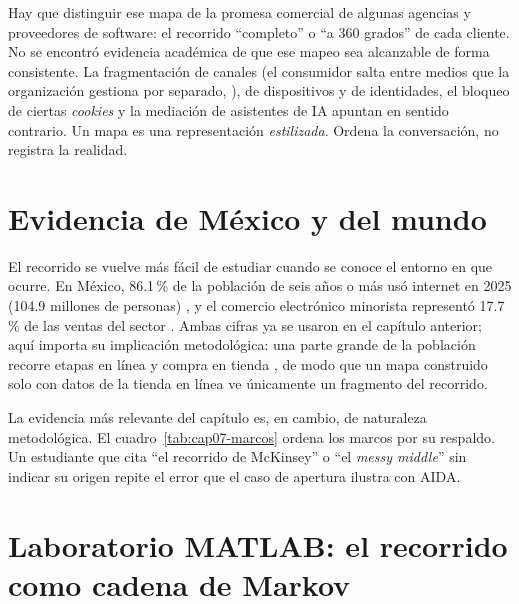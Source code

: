 Hay que distinguir ese mapa de la promesa comercial de algunas agencias y
proveedores de software: el recorrido \enquote{completo} o \enquote{a 360
grados} de cada cliente. No se encontró evidencia académica de que ese mapeo
sea alcanzable de forma consistente. La fragmentación de canales (el consumidor
salta entre medios que la organización gestiona por separado,
\textcite{verhoef2015}), de dispositivos y de
identidades, el bloqueo de ciertas \textit{cookies} y la mediación de
asistentes de IA apuntan en sentido contrario. Un mapa es una representación
\emph{estilizada}. Ordena la conversación, no registra la realidad.

\section{Evidencia de México y del mundo}

El recorrido se vuelve más fácil de estudiar cuando se conoce el entorno en
que ocurre. En México, 86.1\,\% de la población de seis años o más usó
internet en 2025 (104.9 millones de personas) \parencite{inegi2026endutih}, y
el comercio electrónico minorista representó 17.7\,\% de las ventas del
sector \parencite{amvo2026}. Ambas cifras ya se usaron en el capítulo
anterior; aquí importa su implicación metodológica: una parte grande de la
población recorre etapas en línea y compra en tienda
\parencite{halibas2023showrooming}, de modo que un mapa
construido solo con datos de la tienda en línea ve únicamente un fragmento
del recorrido.

La evidencia más relevante del capítulo es, en cambio, de naturaleza
metodológica. El cuadro~\ref{tab:cap07-marcos} ordena los marcos por su
respaldo. Un estudiante que cita \enquote{el recorrido de McKinsey} o
\enquote{el \textit{messy middle}} sin indicar su origen repite el error
que el caso de apertura ilustra con AIDA.

\section{Laboratorio MATLAB: el recorrido como cadena de Markov}
\label{sec:cap07-lab}


